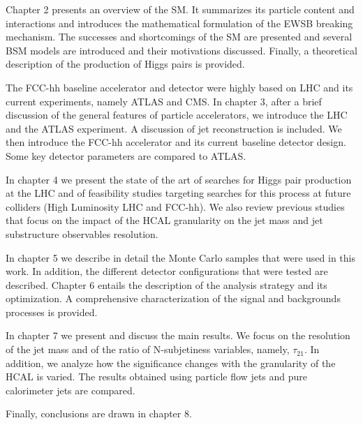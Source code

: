 Chapter 2 presents an overview of the SM. It summarizes its particle content and interactions and introduces the mathematical formulation of the EWSB breaking mechanism. The successes and shortcomings of the SM are presented and several BSM models are introduced and their motivations discussed. Finally, a theoretical description of the production of Higgs pairs is provided.

The FCC-hh baseline accelerator and detector were highly based on LHC and its current experiments, namely ATLAS and CMS. In chapter 3, after a brief discussion of the general features of particle accelerators, we introduce the LHC and the ATLAS experiment. A discussion of jet reconstruction is included. We then introduce the FCC-hh accelerator and its current baseline detector design. Some key detector parameters are compared to ATLAS.

In chapter 4 we present the state of the art of searches for Higgs pair production at the LHC and of feasibility studies targeting searches for this process at future colliders (High Luminosity LHC and FCC-hh). We also review previous studies that focus on the impact of the HCAL granularity on the jet mass and jet substructure observables resolution.

In chapter 5 we describe in detail the Monte Carlo samples that were used in this work. In addition, the different detector configurations that were tested are described. Chapter 6 entails the description of the analysis strategy and its optimization. A comprehensive characterization of the signal and backgrounds processes is provided. 

In chapter 7 we present and discuss the main results. We focus on the resolution of the jet mass and of the ratio of N-subjetiness variables, namely, $\tau_{21}$. In addition, we analyze how the significance changes with the granularity of the HCAL is varied. The results obtained using particle flow jets and pure calorimeter jets are compared.

Finally, conclusions are drawn in chapter 8.


